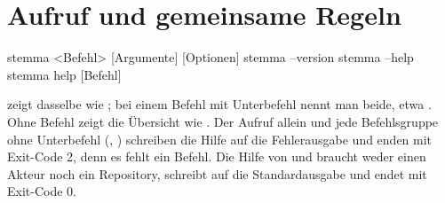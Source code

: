 \startplacefigure[title={Welcher Befehl berührt welche Zone},reference=fig:commands,location=here]
\stopplacefigure

\section{Aufruf und gemeinsame Regeln}

\starttyping
stemma <Befehl> [Argumente] [Optionen]
stemma --version
stemma --help
stemma help [Befehl]
\stoptyping

 zeigt dasselbe wie ; bei einem Befehl mit
Unterbefehl nennt man beide, etwa .
Ohne Befehl zeigt  die Übersicht wie .
Der Aufruf  allein und jede Befehlsgruppe ohne Unterbefehl
(, ) schreiben die Hilfe auf die
Fehlerausgabe und enden mit Exit-Code 2, denn es fehlt ein Befehl.
Die Hilfe von  und  braucht weder einen Akteur noch ein Repository,
schreibt auf die Standardausgabe und endet mit Exit-Code 0.

